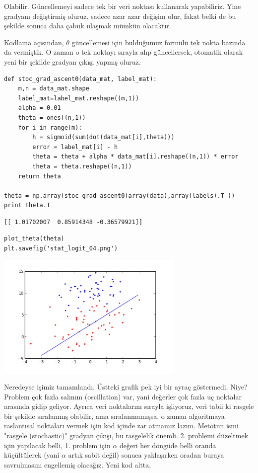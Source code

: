 \documentclass[12pt,fleqn]{article}\usepackage{../../common}
\begin{document}
Olabilir. Güncellemeyi sadece tek bir veri noktası kullanarak yapabiliriz. Yine
gradyanı değiştirmiş oluruz, sadece azar azar değişim olur, fakat belki de bu
şekilde sonuca daha çabuk ulaşmak mümkün olacaktır.

Kodlama açısından, $\theta$ güncellemesi için bulduğumuz formülü tek nokta
bazında da vermiştik.  O zaman o tek noktayı sırayla alıp güncellersek, otomatik
olarak yeni bir şekilde gradyan çıkışı yapmış oluruz.

\begin{verbatim}
def stoc_grad_ascent0(data_mat, label_mat):
    m,n = data_mat.shape
    label_mat=label_mat.reshape((m,1))
    alpha = 0.01
    theta = ones((n,1))
    for i in range(m):
        h = sigmoid(sum(dot(data_mat[i],theta)))
        error = label_mat[i] - h
        theta = theta + alpha * data_mat[i].reshape((n,1)) * error
        theta = theta.reshape((n,1))
    return theta

theta = np.array(stoc_grad_ascent0(array(data),array(labels).T ))
print theta.T
\end{verbatim}

\begin{verbatim}
[[ 1.01702007  0.85914348 -0.36579921]]
\end{verbatim}

\begin{verbatim}
plot_theta(theta)
plt.savefig('stat_logit_04.png')
\end{verbatim}

\includegraphics[height=6cm]{stat_logit_04.png}

Neredeyse işimiz tamamlandı. Üstteki grafik pek iyi bir ayraç göstermedi.  Niye?
Problem çok fazla salınım (oscillation) var, yani değerler çok fazla uç noktalar
arasında gidip geliyor. Ayrıca veri noktalarını sırayla işliyoruz, veri tabii ki
rasgele bir şekilde sıralanmış olabilir, ama sıralanmamışsa, o zaman algoritmaya
raslantısal noktaları vermek için kod içinde zar atmamız lazım. Metotun ismi
"rasgele (stochastic)" gradyan çıkışı, bu rasgelelik önemli. 2. problemi
düzeltmek için yapılacak belli, 1. problem için $\alpha$ değeri her döngüde
belli oranda küçültülerek (yani $\alpha$ artık sabit değil) sonuca yaklaşırken
oradan buraya savrulmasını engellemiş olacağız. Yeni kod altta,
\end{document}
